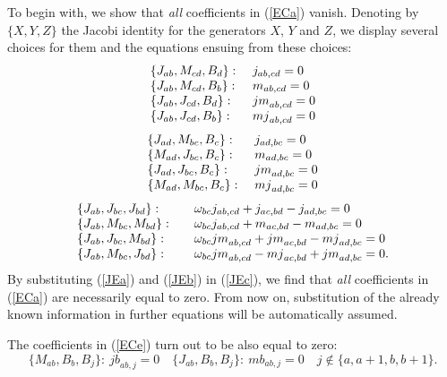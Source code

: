 \documentclass[12pt]{article}
\begin{document}
To begin with, we show that \emph{all} coefficients in
(\ref{ECa}) vanish.  Denoting by $\{X,Y,Z\}$ the Jacobi
identity for the generators $X$,
$Y$ and $Z$, we display several choices for them
and the equations ensuing from these choices:
\begin{equation}
\begin{array}{ll}
\{{J}_{ab},{M}_{cd},{B}_d\}:&\ {j}_{ab,cd}=0\cr
\{{J}_{ab},{M}_{cd},{B}_b\}:&\ {m}_{ab,cd}=0\cr
\{{J}_{ab},{J}_{cd},{B}_d\}:&\ {jm}_{ab,cd}=0\cr
\{{J}_{ab},{J}_{cd},{B}_b\}:&\ {mj}_{ab,cd}=0
\end{array}
\label{JEa}
\end{equation}
\begin{equation}
\begin{array}{ll}
\{{J}_{ad},{M}_{bc},{B}_c\}:&\ {j}_{ad,bc}=0\cr
\{{M}_{ad},{J}_{bc},{B}_c\}:&\ {m}_{ad,bc}=0\cr
\{{J}_{ad},{J}_{bc},{B}_c\}:&\ {jm}_{ad,bc}=0\cr
\{{M}_{ad},{M}_{bc},{B}_c\}:&\ {mj}_{ad,bc}=0
\end{array}
\label{JEb}
\end{equation}
\begin{equation}
\begin{array}{lll}
\{{J}_{ab},{J}_{bc},{J}_{bd}\}:&\quad
{\omega}_{bc}{j}_{ab,cd}+{j}_{ac,bd}-{j}_{ad,bc}=0\cr
\{{J}_{ab},{M}_{bc},{M}_{bd}\}:&\quad
{\omega}_{bc}{j}_{ab,cd}+{m}_{ac,bd}-{m}_{ad,bc}=0\cr
\{{J}_{ab},{J}_{bc},{M}_{bd}\}:&\quad
{\omega}_{bc}{jm}_{ab,cd}+{jm}_{ac,bd}-{mj}_{ad,bc}=0\cr
\{{J}_{ab},{M}_{bc},{J}_{bd}\}:&\quad
{\omega}_{bc}{jm}_{ab,cd}-{mj}_{ac,bd}+{jm}_{ad,bc}=0 .\cr
\end{array}
\label{JEc}
\end{equation}
By substituting (\ref{JEa}) and (\ref{JEb}) in (\ref{JEc}), we find
that \emph{all} coefficients in (\ref{ECa})  are necessarily equal to
zero. From now on, substitution of the already known information in
further equations will be automatically assumed.

The coefficients  in (\ref{ECe}) turn out to be also equal to zero:
\begin{equation}
\{{M}_{ab},{B}_{b},{B}_j\}: \ {jb}_{ab,j}=0 \quad
\{{J}_{ab},{B}_{b},{B}_j\}: \ {mb}_{ab,j}=0 \quad
j\notin \{a,a+1,b,b+1\} .
\label{cd}
\end{equation}
\end{document}
